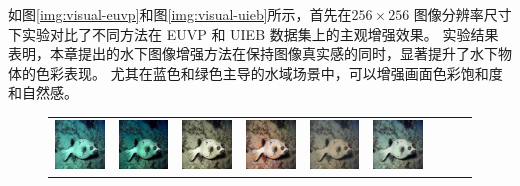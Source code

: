 如图\ref{img:visual-euvp}和图\ref{img:visual-uieb}所示，首先在$256 \times 256$ 图像分辨率尺寸下实验对比了不同方法在 EUVP 和 UIEB 数据集上的主观增强效果。
实验结果表明，本章提出的水下图像增强方法在保持图像真实感的同时，显著提升了水下物体的色彩表现。
尤其在蓝色和绿色主导的水域场景中，可以增强画面色彩饱和度和自然感。
\begin{figure}[t]
	\begin{center}
		\begin{tabular}{ccccccccc}
			\includegraphics[width = 0.10\linewidth,height=0.10\linewidth]{figures/ch3/compare/EUVP/Input/264318_n02655020_17544.JPEG} & \hspace{-0.40cm}
			\includegraphics[width = 0.10\linewidth,height=0.10\linewidth]{figures/ch3/compare/EUVP/UDCP/264318_n02655020_17544.JPEG}  & \hspace{-0.40cm}
			\includegraphics[width = 0.10\linewidth,height=0.10\linewidth]{figures/ch3/compare/EUVP/UGAN/264318_n02655020_17544.JPEG}  & \hspace{-0.40cm}
			\includegraphics[width = 0.10\linewidth,height=0.10\linewidth]{figures/ch3/compare/EUVP/FGAN/264318_n02655020_17544.JPEG}  & \hspace{-0.40cm}
			\includegraphics[width = 0.10\linewidth,height=0.10\linewidth]{figures/ch3/compare/EUVP/UWCNN/264318_n02655020_17544.JPEG} & \hspace{-0.40cm}
			\includegraphics[width = 0.10\linewidth,height=0.10\linewidth]{figures/ch3/compare/EUVP/Ucolor/264318_n02655020_17544.JPEG}& \hspace{-0.40cm}

\end{tabular}
\end{center}
\end{figure}
